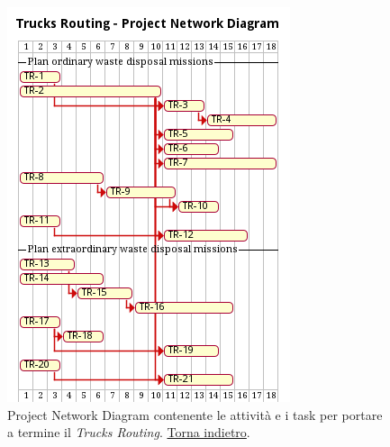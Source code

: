 \begin{figure}[H]
    \centering
    \includegraphics[width=\textwidth]{img/gantt-trucks-routing.pm}
    \caption{Project Network Diagram contenente le attività e i task per portare a termine il \textit{Trucks Routing}. \hyperlink{back:gantt-trucks-routing}{Torna indietro}.}
    \label{fig:gantt-trucks-routing}
\end{figure}

